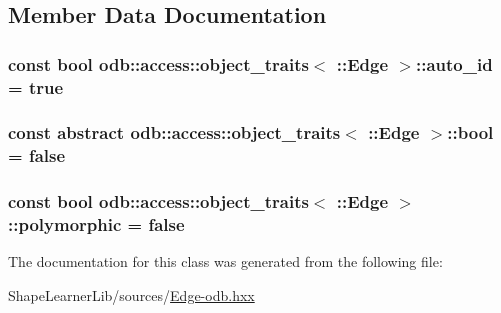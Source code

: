 \subsection{Member Data Documentation}
\hypertarget{classodb_1_1access_1_1object__traits_3_01_1_1_edge_01_4_af28e8db340289cf80e2e624dd95f5926}{}
\subsubsection[{auto\+\_\+id}]{\setlength{\rightskip}{0pt plus 5cm}const {\bf bool} odb\+::access\+::object\+\_\+traits$<$ \+::{\bf Edge} $>$\+::auto\+\_\+id = true\hspace{0.3cm}{\ttfamily [static]}}\label{classodb_1_1access_1_1object__traits_3_01_1_1_edge_01_4_af28e8db340289cf80e2e624dd95f5926}
\hypertarget{classodb_1_1access_1_1object__traits_3_01_1_1_edge_01_4_a16e9c480b5803d3dd980cd934f04dd7b}{}
\subsubsection[{bool}]{\setlength{\rightskip}{0pt plus 5cm}const abstract odb\+::access\+::object\+\_\+traits$<$ \+::{\bf Edge} $>$\+::bool = false\hspace{0.3cm}{\ttfamily [static]}}\label{classodb_1_1access_1_1object__traits_3_01_1_1_edge_01_4_a16e9c480b5803d3dd980cd934f04dd7b}
\hypertarget{classodb_1_1access_1_1object__traits_3_01_1_1_edge_01_4_a94898f507206cbbfaa59e296607c0e4e}{}
\subsubsection[{polymorphic}]{\setlength{\rightskip}{0pt plus 5cm}const {\bf bool} odb\+::access\+::object\+\_\+traits$<$ \+::{\bf Edge} $>$\+::polymorphic = false\hspace{0.3cm}{\ttfamily [static]}}\label{classodb_1_1access_1_1object__traits_3_01_1_1_edge_01_4_a94898f507206cbbfaa59e296607c0e4e}


The documentation for this class was generated from the following file\+:\begin{DoxyCompactItemize}
\item 
Shape\+Learner\+Lib/sources/\hyperlink{_edge-odb_8hxx}{Edge-\/odb.\+hxx}\end{DoxyCompactItemize}
